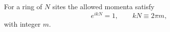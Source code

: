 \documentclass{article}
\begin{document}
For a ring of $N$ sites the allowed momenta satisfy
\begin{equation}
e^{i k N} = 1, \qquad k N \equiv 2\pi m ,
\label{eq:ring}
\end{equation}
with integer $m$.
\end{document}
